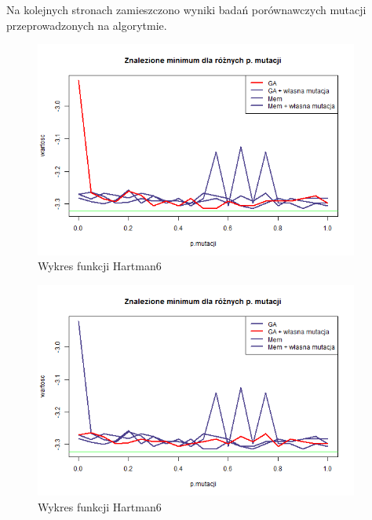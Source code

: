 \documentclass[11pt, a4paper]{article}
\newcommand{\fbi}{\leavevmode{\parindent=1em\indent}}
\begin{document}
\fbi
Na kolejnych stronach zamieszczono wyniki badań porównawczych mutacji przeprowadzonych na algorytmie.

\begin{figure}[H]
	\centering
	\includegraphics[width=0.95\textwidth]{./assets/Hartman6mut1.png}
	\caption{Wykres funkcji Hartman6}
	\label{fig:Hartman6mut1}
\end{figure}

\begin{figure}[H]
	\centering
	\includegraphics[width=0.95\textwidth]{./assets/Hartman6mut2.png}
	\caption{Wykres funkcji Hartman6}
	\label{fig:Hartman6mut2}
\end{figure}
\end{document}
